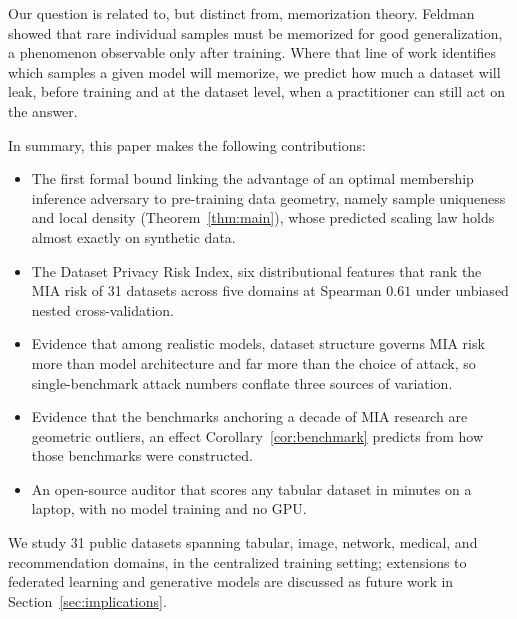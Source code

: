Our question is related to, but distinct from, memorization theory.
Feldman~\cite{feldman2020memorization} showed that rare individual
samples must be memorized for good generalization, a phenomenon
observable only after training. Where that line of work identifies which
samples a given model will memorize, we predict how much a dataset will
leak, before training and at the dataset level, when a practitioner can
still act on the answer.

In summary, this paper makes the following contributions:

\begin{itemize}

\item The first formal bound linking the advantage of an optimal
membership inference adversary to pre-training data geometry, namely
sample uniqueness and local density (Theorem~\ref{thm:main}), whose
predicted scaling law holds almost exactly on synthetic data.

\item The Dataset Privacy Risk Index, six distributional features that
rank the MIA risk of 31 datasets across five domains at Spearman $0.61$
under unbiased nested cross-validation.

\item Evidence that among realistic models, dataset structure governs
MIA risk more than model architecture and far more than the choice of
attack, so single-benchmark attack numbers conflate three sources of
variation.

\item Evidence that the benchmarks anchoring a decade of MIA research
are geometric outliers, an effect Corollary~\ref{cor:benchmark} predicts
from how those benchmarks were constructed.

\item An open-source auditor that scores any tabular dataset in minutes
on a laptop, with no model training and no GPU.

\end{itemize}

We study 31 public datasets spanning tabular, image, network, medical,
and recommendation domains, in the centralized training setting;
extensions to federated learning and generative models are discussed as
future work in Section~\ref{sec:implications}.
